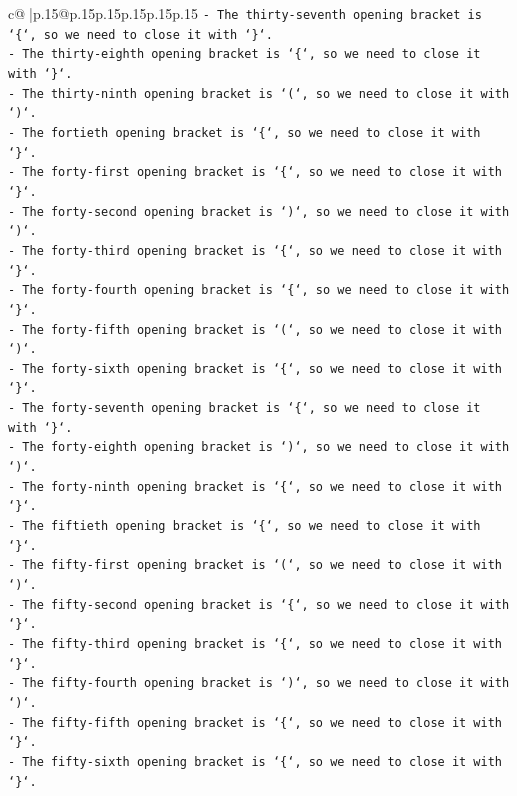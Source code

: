 \documentclass{article}
\begin{document}
{\begin{supertabular}{c@{$\;$}|p{.15\linewidth}@{}p{.15\linewidth}p{.15\linewidth}p{.15\linewidth}p{.15\linewidth}p{.15\linewidth}}
{{{\texttt{{-} The thirty{-}seventh opening bracket is `\{`, so we need to close it with `\}`.} \\
\texttt{{-} The thirty{-}eighth opening bracket is `\{`, so we need to close it with `\}`.} \\
\texttt{{-} The thirty{-}ninth opening bracket is `(`, so we need to close it with `)`.} \\
\texttt{{-} The fortieth opening bracket is `\{`, so we need to close it with `\}`.} \\
\texttt{{-} The forty{-}first opening bracket is `\{`, so we need to close it with `\}`.} \\
\texttt{{-} The forty{-}second opening bracket is `)`, so we need to close it with `)`.} \\
\texttt{{-} The forty{-}third opening bracket is `\{`, so we need to close it with `\}`.} \\
\texttt{{-} The forty{-}fourth opening bracket is `\{`, so we need to close it with `\}`.} \\
\texttt{{-} The forty{-}fifth opening bracket is `(`, so we need to close it with `)`.} \\
\texttt{{-} The forty{-}sixth opening bracket is `\{`, so we need to close it with `\}`.} \\
\texttt{{-} The forty{-}seventh opening bracket is `\{`, so we need to close it with `\}`.} \\
\texttt{{-} The forty{-}eighth opening bracket is `)`, so we need to close it with `)`.} \\
\texttt{{-} The forty{-}ninth opening bracket is `\{`, so we need to close it with `\}`.} \\
\texttt{{-} The fiftieth opening bracket is `\{`, so we need to close it with `\}`.} \\
\texttt{{-} The fifty{-}first opening bracket is `(`, so we need to close it with `)`.} \\
\texttt{{-} The fifty{-}second opening bracket is `\{`, so we need to close it with `\}`.} \\
\texttt{{-} The fifty{-}third opening bracket is `\{`, so we need to close it with `\}`.} \\
\texttt{{-} The fifty{-}fourth opening bracket is `)`, so we need to close it with `)`.} \\
\texttt{{-} The fifty{-}fifth opening bracket is `\{`, so we need to close it with `\}`.} \\
\texttt{{-} The fifty{-}sixth opening bracket is `\{`, so we need to close it with `\}`.} \\
}}}
\end{supertabular}}
\end{document}
